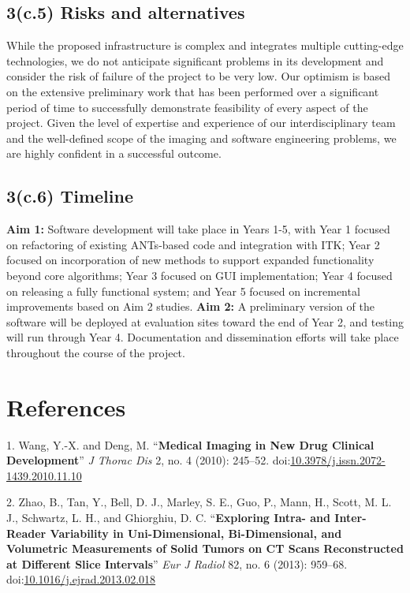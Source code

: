 \documentclass[11pt,]{article}
\begin{document}
\subsection{3(c.5) Risks and
alternatives}\label{c.5-risks-and-alternatives}

While the proposed infrastructure is complex and integrates multiple
cutting-edge technologies, we do not anticipate significant problems in
its development and consider the risk of failure of the project to be
very low. Our optimism is based on the extensive preliminary work that
has been performed over a significant period of time to successfully
demonstrate feasibility of every aspect of the project. Given the level
of expertise and experience of our interdisciplinary team and the
well-defined scope of the imaging and software engineering problems, we
are highly confident in a successful outcome.

\subsection{3(c.6) Timeline}\label{c.6-timeline}

\textbf{Aim 1:} Software development will take place in Years 1-5, with
Year 1 focused on refactoring of existing ANTs-based code and
integration with ITK; Year 2 focused on incorporation of new methods to
support expanded functionality beyond core algorithms; Year 3 focused on
GUI implementation; Year 4 focused on releasing a fully functional
system; and Year 5 focused on incremental improvements based on Aim 2
studies. \textbf{Aim 2:} A preliminary version of the software will be
deployed at evaluation sites toward the end of Year 2, and testing will
run through Year 4. Documentation and dissemination efforts will take
place throughout the course of the project.

\clearpage

\newpage

\section*{References}\label{references}

1. Wang, Y.-X. and Deng, M. ``\textbf{Medical Imaging in New Drug
Clinical Development}'' \emph{J Thorac Dis} 2, no. 4 (2010): 245--52.
doi:\href{http://dx.doi.org/10.3978/j.issn.2072-1439.2010.11.10}{10.3978/j.issn.2072-1439.2010.11.10}

2. Zhao, B., Tan, Y., Bell, D. J., Marley, S. E., Guo, P., Mann, H.,
Scott, M. L. J., Schwartz, L. H., and Ghiorghiu, D. C.
``\textbf{Exploring Intra- and Inter-Reader Variability in
Uni-Dimensional, Bi-Dimensional, and Volumetric Measurements of Solid
Tumors on CT Scans Reconstructed at Different Slice Intervals}''
\emph{Eur J Radiol} 82, no. 6 (2013): 959--68.
doi:\href{http://dx.doi.org/10.1016/j.ejrad.2013.02.018}{10.1016/j.ejrad.2013.02.018}
\end{document}

